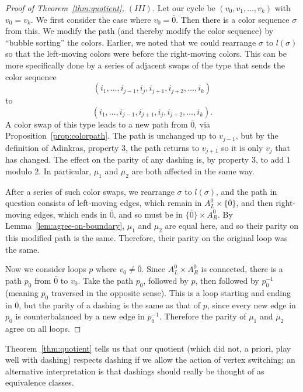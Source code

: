 \documentclass[12pt,twoside,singlespace]{article}
\numberwithin{equation}{section}
\theoremstyle{definition}
\begin{document}
\begin{proof}[Proof of Theorem~\ref{thm:quotient}, $(III)$]
Let our cycle be $(v_0,v_1,\ldots,v_k)$ with $v_0=v_k$. We first consider the case where $v_0=\overline{0}$.  Then there is a color sequence $\sigma$ from this.  We modify the path (and thereby modify the color sequence) by ``bubble sorting'' the colors.  Earlier, we noted that we could rearrange $\sigma$ to $l(\sigma)$ so that the left-moving colors were before the right-moving colors.  This can be more specifically done by a series of adjacent swaps of the type that sends the color sequence
\[(i_1,\ldots,i_{j-1},i_j,i_{j+1},i_{j+2},\ldots,i_k)\]
to
\[(i_1,\ldots,i_{j-1},i_{j+1},i_j,i_{j+2},\ldots,i_k).\]
A color swap of this type leads to a new path from $\overline{0}$, via Proposition~\ref{prop:colorpath}.  The path is unchanged up to $v_{j-1}$, but by the definition of Adinkras, property 3, the path returns to $v_{j+1}$ so it is only $v_j$ that has changed.  The effect on the parity of any dashing is, by property 3, to add $1$ modulo $2$.  In particular, $\mu_1$ and $\mu_2$ are both affected in the same way.

After a series of such color swaps, we rearrange $\sigma$ to $l(\sigma)$, and the path in question consists of left-moving edges, which remain in $A_L^0\times \{\overline{0}\}$, and then right-moving edges, which ends in $\overline{0}$, and so must be in $\{\overline{0}\}\times A_R^0$.  By Lemma~\ref{lem:agree-on-boundary}, $\mu_1$ and $\mu_2$ are equal here, and so their parity on this modified path is the same.  Therefore, their parity on the original loop was the same.

Now we consider loops $p$ where $v_0\not=\overline{0}$.  Since $A_L^0\times A_R^0$ is connected, there is a path $p_0$ from $\overline{0}$ to $v_0$.  Take the path $p_0$, followed by $p$, then followed by $p_0^{-1}$ (meaning $p_0$ traversed in the opposite sense).  This is a loop starting and ending in $\overline{0}$, but the parity of a dashing is the same as that of $p$, since every new edge in $p_0$ is counterbalanced by a new edge in $p_0^{-1}$.  Therefore the parity of $\mu_1$ and $\mu_2$ agree on all loops.
\end{proof}

 
Theorem~\ref{thm:quotient} tells us that our quotient (which did not, a priori, play well with dashing) respects dashing if we allow the action of vertex switching; an alternative interpretation is that dashings should really be thought of as equivalence classes.
\end{document}
